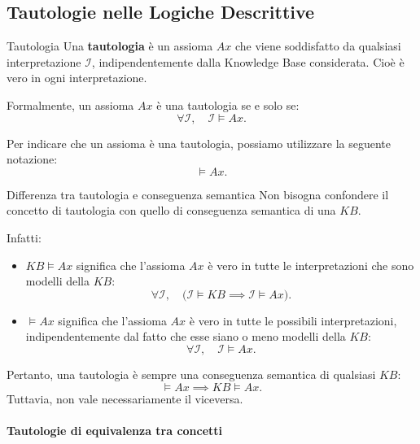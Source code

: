 \subsection{Tautologie nelle Logiche Descrittive}

\begin{definition}{Tautologia}
    Una \textbf{tautologia} è un assioma $Ax$ che viene
    soddisfatto da qualsiasi interpretazione $\mathcal{I}$,
    indipendentemente dalla Knowledge Base considerata.
    Cioè è vero in ogni interpretazione.

    Formalmente, un assioma $Ax$ è una tautologia se e solo se:
    \[
        \forall \mathcal{I}, \quad \mathcal{I} \models Ax.
    \]

    Per indicare che un assioma è una tautologia, possiamo
    utilizzare la seguente notazione:
    \[
        \models Ax.
    \]
\end{definition}

\begin{observation}{Differenza tra tautologia e conseguenza semantica}
    Non bisogna confondere il concetto di tautologia con
    quello di conseguenza semantica di una $KB$.

    Infatti:
    \begin{itemize}
        \item $KB \models Ax$ significa che l'assioma $Ax$
        è vero in tutte le interpretazioni che sono modelli
        della $KB$:
        \[
            \forall \mathcal{I}, \quad
            \bigl(\mathcal{I} \models KB
            \implies \mathcal{I} \models Ax\bigr).
        \]

        \item $\models Ax$ significa che l'assioma $Ax$
        è vero in tutte le possibili interpretazioni,
        indipendentemente dal fatto che esse siano o meno
        modelli della $KB$:
        \[
            \forall \mathcal{I}, \quad
            \mathcal{I} \models Ax.
        \]
    \end{itemize}

    Pertanto, una tautologia è sempre una conseguenza
    semantica di qualsiasi $KB$:
    \[
        \models Ax
        \implies
        KB \models Ax.
    \]
    Tuttavia, non vale necessariamente il viceversa.
\end{observation}

\newpage

\paragraph{Tautologie di equivalenza tra concetti}

